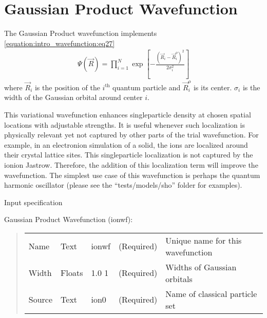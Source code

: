 \documentclass[letterpaper,10pt,english]{sphinxmanual}
\begin{document}
\section{Gaussian Product Wavefunction}
\label{\detokenize{intro_wavefunction:gaussian-product-wavefunction}}\label{\detokenize{intro_wavefunction:ionwf}}
The Gaussian Product wavefunction implements \eqref{equation:intro_wavefunction:eq27}
\begin{equation}\label{equation:intro_wavefunction:eq27}
\begin{split}\Psi(\vec{R}) = \prod_{i=1}^N \exp\left[ -\frac{(\vec{R}_i-\vec{R}_i^o)^2}{2\sigma_i^2} \right]\end{split}
\end{equation}
where \(\vec{R}_i\) is the position of the \(i^{\text{th}}\)
quantum particle and \(\vec{R}_i^o\) is its center. \(\sigma_i\)
is the width of the Gaussian orbital around center \(i\).

This variational wavefunction enhances single\sphinxhyphen{}particle density at chosen
spatial locations with adjustable strengths. It is useful whenever such
localization is physically relevant yet not captured by other parts of
the trial wavefunction. For example, in an electron\sphinxhyphen{}ion simulation of a
solid, the ions are localized around their crystal lattice sites. This
single\sphinxhyphen{}particle localization is not captured by the ion\sphinxhyphen{}ion Jastrow.
Therefore, the addition of this localization term will improve the
wavefunction. The simplest use case of this wavefunction is perhaps the
quantum harmonic oscillator (please see the “tests/models/sho” folder
for examples).

\begin{center}Input specification
\end{center}
Gaussian Product Wavefunction (ionwf):
\begin{quote}


\begin{savenotes}\sphinxattablestart
\centering
\begin{tabulary}{\linewidth}[t]{|T|T|T|T|T|}
\hline
\sphinxstyletheadfamily 
{}
&\sphinxstyletheadfamily 
{}
&\sphinxstyletheadfamily 
{}
&\sphinxstyletheadfamily 
{}
&\sphinxstyletheadfamily 
{}
\\
\hline
Name
&
Text
&
ionwf
&
(Required)
&
Unique name for this wavefunction
\\
\hline
Width
&
Floats
&
1.0 \sphinxhyphen{}1
&
(Required)
&
Widths of Gaussian orbitals
\\
\hline
Source
&
Text
&
ion0
&
(Required)
&
Name of classical particle set
\\
\hline
\end{tabulary}
\par
\sphinxattableend\end{savenotes}
\end{quote}
\end{document}

